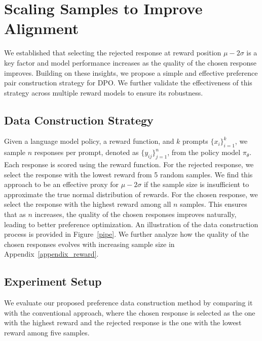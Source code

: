 




\section{Scaling Samples to Improve Alignment }
\label{main_exp}





We established that selecting the rejected response at reward position \(\mu - 2\sigma\) is a key factor and model performance increases as the quality of the chosen response improves. 
Building on these insights, we propose a simple and effective preference pair construction strategy for DPO.
We further validate the effectiveness of this strategy across multiple reward models to ensure its robustness.  

\subsection{Data Construction Strategy}
Given a language model policy, a reward function, and \( k \) prompts \( \{x_i\}_{i=1}^k \), we sample \( n \) responses per prompt, denoted as \( \{y_{ij}\}_{j=1}^n \), from the policy model \( \pi_{\theta} \). 
Each response is scored using the reward function.
For the rejected response, we select the response with the lowest reward from 5 random samples. 
We find this approach to be an effective proxy for \(\mu - 2\sigma\) if the sample size is insufficient to approximate the true normal distribution of rewards. 
For the chosen response, we select the response with the highest reward among all \( n \) samples.  
This ensures that as \( n \) increases, the quality of the chosen responses improves naturally, leading to better preference optimization. 
An illustration of the data construction process is provided in Figure~\ref{pipe}. 
We further analyze how the quality of the chosen responses evolves with increasing sample size in Appendix~\ref{appendix_reward}. 

\subsection{Experiment Setup}
We evaluate our proposed preference data construction method by comparing it with the conventional approach, where the chosen response is selected as the one with the highest reward and the rejected response is the one with the lowest reward among five samples. 

